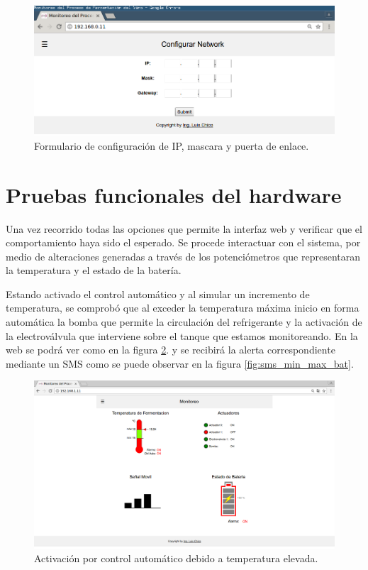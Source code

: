 \begin{figure}[h]
  \centering
  \includegraphics[scale=.25]{./Figures/config_network.png}
  \caption{Formulario de configuración de IP, mascara y puerta de enlace.}
  \label{fig:cfg_net}
\end{figure}




\section{Pruebas funcionales del hardware}
\label{sec:pruebasHW}

Una vez recorrido todas las opciones que permite la interfaz web y verificar que el comportamiento haya sido el esperado. Se procede interactuar con el sistema, por medio de alteraciones generadas a través de los potenciómetros que representaran la temperatura y el estado de la batería.

Estando activado el control automático y al simular un incremento de temperatura, se comprobó que al exceder la temperatura máxima inicio en forma automática la bomba que permite la circulación del refrigerante y la activación de la electroválvula que interviene sobre el tanque que estamos monitoreando. En la web se podrá ver como en la figura \ref{fig:auto_control_active}. y se recibirá la alerta correspondiente mediante un SMS como se puede observar en la figura \ref{fig:sms_min_max_bat}.

\begin{figure}[h]
  \centering
  \includegraphics[scale=.25]{./Figures/auto_control_active.png}
  \caption{Activación por control automático debido a temperatura elevada.}
  \label{fig:auto_control_active}
\end{figure}


